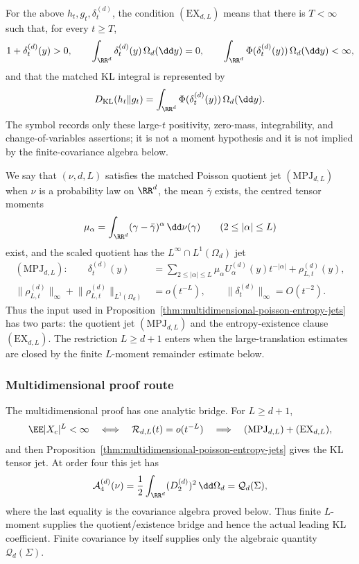 \begin{definition}%
\label{def:multidim-ex-dl}
For the above \(h_t,g_t,\delta_t^{(d)}\), the condition
\((\mathrm{EX}_{d,L})\) means that there is \(T<\infty\) such that, for every
\(t\ge T\),
\[
1+\delta_t^{(d)}(y)>0,\qquad
\int_{\RR^d}\delta_t^{(d)}(y)\,\Omega_d(\dd y)=0,\qquad
\int_{\RR^d}\Phi(\delta_t^{(d)}(y))\,\Omega_d(\dd y)<\infty,
\]
and that the matched KL integral is represented by
\[
D_{\rm KL}(h_t\|g_t)
=\int_{\RR^d}\Phi(\delta_t^{(d)}(y))\,\Omega_d(\dd y).
\]
The symbol records only these large-\(t\) positivity, zero-mass,
integrability, and change-of-variables assertions; it is not a moment
hypothesis and it is not implied by the finite-covariance algebra below.
\end{definition}

We say that \((\nu,d,L)\) satisfies the matched Poisson quotient jet
\((\mathrm{MPJ}_{d,L})\) when \(\nu\) is a probability law on \(\RR^d\), the
mean \(\bar{\gamma}\) exists, the centred tensor moments
\[
\mu_\alpha=\int_{\RR^d}(\gamma-\bar{\gamma})^\alpha\,\dd\nu(\gamma)
\qquad(2\le|\alpha|\le L)
\]
exist, and the scaled quotient has the \(L^\infty\cap L^1(\Omega_d)\) jet
\begin{equation}\label{eq:mpj-dl-definition}
\begin{aligned}
(\mathrm{MPJ}_{d,L}):\qquad
\delta_t^{(d)}(y)
&=
\sum_{2\le\lvert\alpha\rvert\le L}
\mu_\alpha U_\alpha^{(d)}(y)t^{-\lvert\alpha\rvert}
+\rho_{L,t}^{(d)}(y),\\
\lVert\rho_{L,t}^{(d)}\rVert_\infty+
\lVert\rho_{L,t}^{(d)}\rVert_{L^1(\Omega_d)}
&=o(t^{-L}),\qquad
\lVert\delta_t^{(d)}\rVert_\infty=O(t^{-2}).
\end{aligned}
\end{equation}
Thus the input used in
Proposition~\ref{thm:multidimensional-poisson-entropy-jets} has two parts:
the quotient jet \((\mathrm{MPJ}_{d,L})\) and the entropy-existence clause
\((\mathrm{EX}_{d,L})\).  The restriction \(L\ge d+1\) enters when the
large-translation estimates are closed by the finite \(L\)-moment remainder
estimate below.

\subsubsection*{Multidimensional proof route}\leavevmode\par\smallskip
The multidimensional proof has one analytic bridge.  For \(L\ge d+1\),
\[
\EE|X_c|^L<\infty
\quad\Longleftrightarrow\quad
\mathcal R_{d,L}(t)=o(t^{-L})
\quad\Longrightarrow\quad
(\mathrm{MPJ}_{d,L})+(\mathrm{EX}_{d,L}),
\]
and then Proposition~\ref{thm:multidimensional-poisson-entropy-jets} gives the
KL tensor jet.  At order four this jet has
\[
\mathcal A_4^{(d)}(\nu)
=\frac12\int_{\RR^d}(D_2^{(d)})^2\,\dd\Omega_d
=\mathcal Q_d(\Sigma),
\]
where the last equality is the covariance algebra proved below.  Thus finite
\(L\)-moment supplies the quotient/existence bridge and hence the actual
leading KL coefficient.  Finite covariance by itself supplies only the
algebraic quantity \(\mathcal Q_d(\Sigma)\).

